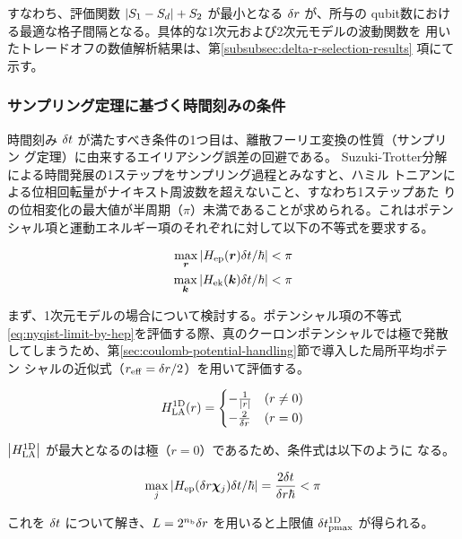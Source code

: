 \documentclass[wabun2025.tex]{subfiles}
\begin{document}
すなわち、評価関数 ${\left| S_1 - S_d \right|} + S_2$ が最小となる $\delta r$ が、所与の
qubit数における最適な格子間隔となる。具体的な1次元および2次元モデルの波動関数を
用いたトレードオフの数値解析結果は、第\ref{subsubsec:delta-r-selection-results}
項にて示す。

\subsubsection{サンプリング定理に基づく時間刻みの条件}

\label{subsubsec:deltat-selection-by-sampling-theorem}

時間刻み $\delta t$ が満たすべき条件の1つ目は、離散フーリエ変換の性質（サンプリン
グ定理）に由来するエイリアシング誤差の回避である\cite{FEIT1982412}。
Suzuki-Trotter分解による時間発展の1ステップをサンプリング過程とみなすと、ハミル
トニアンによる位相回転量がナイキスト周波数を超えないこと、すなわち1ステップあた
りの位相変化の最大値が半周期（$\pi$）未満であることが求められる。これはポテン
シャル項と運動エネルギー項のそれぞれに対して以下の不等式を要求する。

\begin{align}
\max_{\bm{r}}{\left| H_{\mathrm{ep}}(\bm{r})\delta t/\hbar \right|} < \pi \label{eq:nyqist-limit-by-hep}\\
\max_{\bm{k}}{\left| H_{\mathrm{ek}}(\bm{k})\delta t/\hbar \right|} < \pi \label{eq:nyqist-limit-by-hek}
\end{align}

まず、1次元モデルの場合について検討する。ポテンシャル項の不等式
\eqref{eq:nyqist-limit-by-hep}を評価する際、真のクーロンポテンシャルでは極で発散
してしまうため、第\ref{sec:coulomb-potential-handling}節で導入した局所平均ポテン
シャルの近似式（$r_{\mathrm{eff}}=\delta r/2$）を用いて評価する。

\begin{equation}
H_{\mathrm{LA}}^{\mathrm{1D}}(r) = \begin{cases}
-\frac{1}{{\left| r \right|}} & (r\neq0) \\
-\frac{2}{\delta r} & (r=0)
\end{cases}
\end{equation}

${\left| H_{\mathrm{LA}}^{\mathrm{1D}} \right|}$ が最大となるのは極（$r=0$）であるため、条件式は以下のように
なる。

\begin{equation}
\max_{j}{\left| H_{\mathrm{ep}}(\delta r\bm{\chi}_{j})\delta t/\hbar \right|} = \frac{2\delta t}{\delta r\hbar}<\pi
\end{equation}

これを $\delta t$ について解き、$L=2^{n_{\mathrm{b}}}\delta r$ を用いると上限値
$\delta t_{\mathrm{pmax}}^{\mathrm{1D}}$ が得られる。
\end{document}
